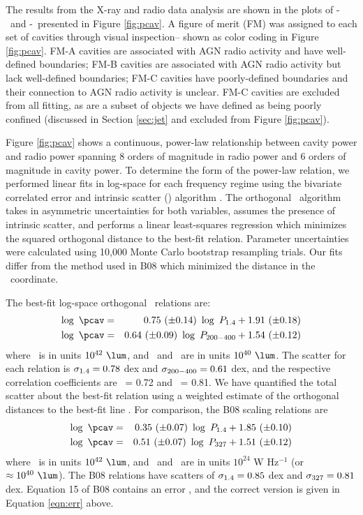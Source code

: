 \documentclass{emulateapj}
\begin{document}
The results from the X-ray and radio data analysis are shown in the
plots of \pcav-\phigh\ and \pcav-\plow\ presented in Figure
\ref{fig:pcav}. A figure of merit (FM) was assigned to each set of
cavities through visual inspection-- shown as color coding in Figure
\ref{fig:pcav}. FM-A cavities are associated with AGN radio activity
and have well-defined boundaries; FM-B cavities are associated with
AGN radio activity but lack well-defined boundaries; FM-C cavities
have poorly-defined boundaries and their connection to AGN radio
activity is unclear. FM-C cavities are excluded from all fitting, as
are a subset of objects we have defined as being poorly confined
(discussed in Section \ref{sec:jet} and excluded from Figure
\ref{fig:pcav}).

Figure \ref{fig:pcav} shows a continuous, power-law relationship
between cavity power and radio power spanning 8 orders of magnitude in
radio power and 6 orders of magnitude in cavity power. To determine
the form of the power-law relation, we performed linear fits in
log-space for each frequency regime using the bivariate correlated
error and intrinsic scatter (\bces) algorithm \citep{bces}. The
orthogonal \bces\ algorithm takes in asymmetric uncertainties for both
variables, assumes the presence of intrinsic scatter, and performs a
linear least-squares regression which minimizes the squared orthogonal
distance to the best-fit relation. Parameter uncertainties were
calculated using 10,000 Monte Carlo bootstrap resampling trials. Our
fits differ from the method used in B08 which minimized the distance
in the \pcav\ coordinate.

The best-fit log-space orthogonal \bces\ relations are:
\begin{eqnarray}
  \log~\pcav &=& 0.75~(\pm 0.14)~\log~\phigh + 1.91~(\pm 0.18) \label{eqn:high}\\
  \log~\pcav &=& 0.64~(\pm 0.09)~\log~\plow + 1.54~(\pm 0.12) \label{eqn:low}
\end{eqnarray}
where \pcav\ is in units $10^{42} ~\lum$, and \phigh\ and \plow\ are
in units $10^{40} ~\lum$. The scatter for each relation is $\sigma_{\mathrm{1.4}} =
0.78$ dex and $\sigma_{\mathrm{200-400}} = 0.61$ dex, and the respective correlation
coefficients are \rhigh\ = 0.72 and \rlow\ = 0.81. We have quantified
the total scatter about the best-fit relation using a weighted
estimate of the orthogonal distances to the best-fit line
\citep[see][]{2009A&A...498..361P}. For comparison, the B08 scaling
relations are
\begin{eqnarray}
  \log~\pcav &=& 0.35~(\pm 0.07)~\log~\phigh + 1.85~(\pm 0.10) \\
  \log~\pcav &=& 0.51~(\pm 0.07)~\log~\pthree + 1.51~(\pm 0.12) \label{eqn:err}
\end{eqnarray}
where \pcav\ is in units $10^{42} ~\lum$, and \phigh\ and \pthree\ are
in units $10^{24}$ W Hz$^{-1}$ (or $\approx 10^{40} ~\lum$). The B08
relations have scatters of $\sigma_{\mathrm{1.4}} = 0.85$ dex and $\sigma_{\mathrm{327}} = 0.81$
dex. Equation 15 of B08 contains an error \citep{birzan08err}, and the
correct version is given in Equation \ref{eqn:err} above.
\end{document}
